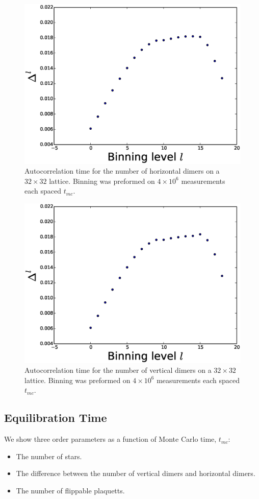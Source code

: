 \documentclass[aps,floatfix,11pt]{revtex4-1}
\begin{document}
\begin{figure}[h]
    \centering
    \includegraphics[width=8.5 cm]{auto_cor_num_horz}
    \caption{Autocorrelation time for the number of horizontal dimers on a $32\times 32$ lattice. Binning was preformed on $4\times 10^6$
    measurements each spaced $t_{mc}$. \label{fig:auto_cor_num_stars}}
\end{figure}

\begin{figure}[h]
    \centering
    \includegraphics[width=8.5 cm]{auto_cor_num_vert}
    \caption{Autocorrelation time for the number of vertical dimers on a $32\times 32$ lattice. Binning was preformed on $4\times 10^6$
    measurements each spaced $t_{mc}$. \label{fig:auto_cor_num_stars}}
\end{figure}

\clearpage
\subsection{Equilibration Time}

We show three order parameters as a function of Monte Carlo time, $t_{mc}$: 

\begin{itemize}
    \item The number of stars.
    \item The difference between the number of vertical dimers and horizontal dimers.
    \item The number of flippable plaquetts.
\end{itemize}
\end{document}
